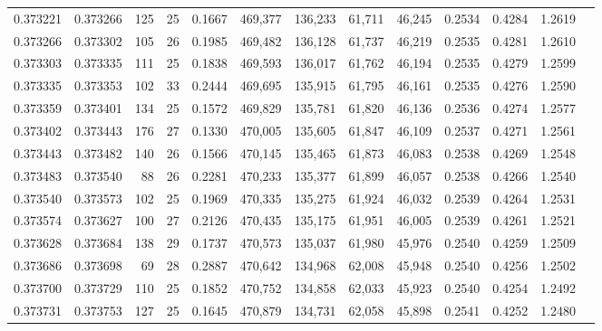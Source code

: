 \begin{tabular}{rrrrrrrrrrrrr}
0.373221 & 0.373266 &   125 &  25 &                                     0.1667 & 469,377 & 136,233 &  61,711 &  46,245 & 0.2534 & 0.4284 & 1.2619 \\
0.373266 & 0.373302 &   105 &  26 &                                     0.1985 & 469,482 & 136,128 &  61,737 &  46,219 & 0.2535 & 0.4281 & 1.2610 \\
0.373303 & 0.373335 &   111 &  25 &                                     0.1838 & 469,593 & 136,017 &  61,762 &  46,194 & 0.2535 & 0.4279 & 1.2599 \\
0.373335 & 0.373353 &   102 &  33 &                                     0.2444 & 469,695 & 135,915 &  61,795 &  46,161 & 0.2535 & 0.4276 & 1.2590 \\
0.373359 & 0.373401 &   134 &  25 &                                     0.1572 & 469,829 & 135,781 &  61,820 &  46,136 & 0.2536 & 0.4274 & 1.2577 \\
0.373402 & 0.373443 &   176 &  27 &                                     0.1330 & 470,005 & 135,605 &  61,847 &  46,109 & 0.2537 & 0.4271 & 1.2561 \\
0.373443 & 0.373482 &   140 &  26 &                                     0.1566 & 470,145 & 135,465 &  61,873 &  46,083 & 0.2538 & 0.4269 & 1.2548 \\
0.373483 & 0.373540 &    88 &  26 &                                     0.2281 & 470,233 & 135,377 &  61,899 &  46,057 & 0.2538 & 0.4266 & 1.2540 \\
0.373540 & 0.373573 &   102 &  25 &                                     0.1969 & 470,335 & 135,275 &  61,924 &  46,032 & 0.2539 & 0.4264 & 1.2531 \\
0.373574 & 0.373627 &   100 &  27 &                                     0.2126 & 470,435 & 135,175 &  61,951 &  46,005 & 0.2539 & 0.4261 & 1.2521 \\
0.373628 & 0.373684 &   138 &  29 &                                     0.1737 & 470,573 & 135,037 &  61,980 &  45,976 & 0.2540 & 0.4259 & 1.2509 \\
0.373686 & 0.373698 &    69 &  28 &                                     0.2887 & 470,642 & 134,968 &  62,008 &  45,948 & 0.2540 & 0.4256 & 1.2502 \\
0.373700 & 0.373729 &   110 &  25 &                                     0.1852 & 470,752 & 134,858 &  62,033 &  45,923 & 0.2540 & 0.4254 & 1.2492 \\
0.373731 & 0.373753 &   127 &  25 &                                     0.1645 & 470,879 & 134,731 &  62,058 &  45,898 & 0.2541 & 0.4252 & 1.2480 \\

\end{tabular}
